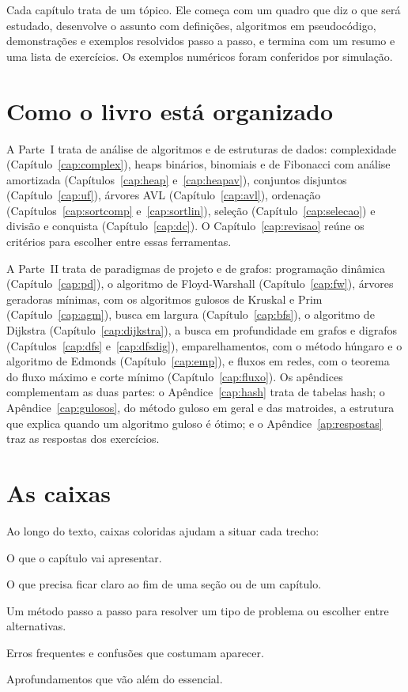 \documentclass[11pt,a4paper,oneside,openany]{book}
\theoremstyle{plain}
\theoremstyle{definition}
\theoremstyle{remark}
\newcounter{exerc}[chapter]
\numberwithin{equation}{chapter}
\begin{document}
Cada capítulo trata de um tópico. Ele começa com um quadro que diz o que será estudado, desenvolve o assunto com definições, algoritmos em pseudocódigo, demonstrações e exemplos resolvidos passo a passo, e termina com um resumo e uma lista de exercícios. Os exemplos numéricos foram conferidos por simulação.

\section*{Como o livro está organizado}
A Parte~I trata de análise de algoritmos e de estruturas de dados: complexidade (Capítulo~\ref{cap:complex}), heaps binários, binomiais e de Fibonacci com análise amortizada (Capítulos~\ref{cap:heap} e~\ref{cap:heapav}), conjuntos disjuntos (Capítulo~\ref{cap:uf}), árvores AVL (Capítulo~\ref{cap:avl}), ordenação (Capítulos~\ref{cap:sortcomp} e~\ref{cap:sortlin}), seleção (Capítulo~\ref{cap:selecao}) e divisão e conquista (Capítulo~\ref{cap:dc}). O Capítulo~\ref{cap:revisao} reúne os critérios para escolher entre essas ferramentas.

A Parte~II trata de paradigmas de projeto e de grafos: programação dinâmica (Capítulo~\ref{cap:pd}), o algoritmo de Floyd-Warshall (Capítulo~\ref{cap:fw}), árvores geradoras mínimas, com os algoritmos gulosos de Kruskal e Prim (Capítulo~\ref{cap:agm}), busca em largura (Capítulo~\ref{cap:bfs}), o algoritmo de Dijkstra (Capítulo~\ref{cap:dijkstra}), a busca em profundidade em grafos e digrafos (Capítulos~\ref{cap:dfs} e~\ref{cap:dfsdig}), emparelhamentos, com o método húngaro e o algoritmo de Edmonds (Capítulo~\ref{cap:emp}), e fluxos em redes, com o teorema do fluxo máximo e corte mínimo (Capítulo~\ref{cap:fluxo}). Os apêndices complementam as duas partes: o Apêndice~\ref{cap:hash} trata de tabelas hash; o Apêndice~\ref{cap:gulosos}, do método guloso em geral e das matroides, a estrutura que explica quando um algoritmo guloso é ótimo; e o Apêndice~\ref{ap:respostas} traz as respostas dos exercícios.

\section*{As caixas}
Ao longo do texto, caixas coloridas ajudam a situar cada trecho:
\begin{objetivos}
O que o capítulo vai apresentar.
\end{objetivos}
\begin{chave}
O que precisa ficar claro ao fim de uma seção ou de um capítulo.
\end{chave}
\begin{roteiro}[Roteiro]
Um método passo a passo para resolver um tipo de problema ou escolher entre alternativas.
\end{roteiro}
\begin{cuidado}
Erros frequentes e confusões que costumam aparecer.
\end{cuidado}
\begin{complemento}
Aprofundamentos que vão além do essencial.
\end{complemento}
\end{document}
